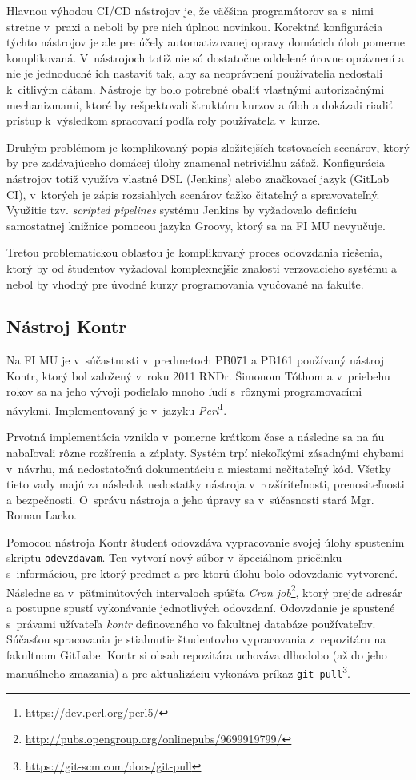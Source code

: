 \documentclass[
  digital, %
  oneside, %
  table,   %
  lof,     %
  lot,   %
]{fithesis3}
\newcommand*{\footurl}[1]{\footnote{\url{#1}}}
\begin{document}
Hlavnou výhodou CI/CD nástrojov je, že väčšina programátorov sa s~nimi stretne v~praxi a neboli by pre nich úplnou novinkou. Korektná konfigurácia týchto nástrojov je ale pre účely automatizovanej opravy domácich úloh pomerne komplikovaná. V~nástrojoch totiž nie sú dostatočne oddelené úrovne oprávnení a nie je jednoduché ich nastaviť tak, aby sa neoprávnení používatelia nedostali k~citlivým dátam. Nástroje by bolo potrebné obaliť vlastnými autorizačnými mechanizmami, ktoré by rešpektovali štruktúru kurzov a úloh a dokázali riadiť prístup k~výsledkom spracovaní podľa roly používateľa v~kurze.

Druhým problémom je komplikovaný popis zložitejších testovacích scenárov, ktorý by pre zadávajúceho domácej úlohy znamenal netriviálnu záťaž. Konfigurácia nástrojov totiž využíva vlastné DSL (Jenkins) alebo značkovací jazyk (GitLab CI), v~ktorých je zápis rozsiahlych scenárov ťažko čitateľný a spravovateľný. Využitie tzv. \textit{scripted pipelines} systému Jenkins by vyžadovalo definíciu samostatnej knižnice pomocou jazyka Groovy, ktorý sa na FI MU nevyučuje.

Treťou problematickou oblasťou je komplikovaný proces odovzdania riešenia, ktorý by od študentov vyžadoval komplexnejšie znalosti verzovacieho systému a nebol by vhodný pre úvodné kurzy programovania vyučované na fakulte.

\subsection{Nástroj Kontr}

Na FI MU je v~súčastnosti v~predmetoch PB071 a PB161 používaný nástroj Kontr, ktorý bol založený v~roku 2011 RNDr. Šimonom Tóthom a v~priebehu rokov sa na jeho vývoji podieľalo mnoho ľudí s~rôznymi programovacími návykmi. Implementovaný je v~jazyku \emph{Perl}\footnote{\url{https://dev.perl.org/perl5/}}.

Prvotná implementácia vznikla v~pomerne krátkom čase a následne sa na ňu nabaľovali rôzne rozšírenia a záplaty. Systém trpí niekoľkými zásadnými chybami v~návrhu, má nedostatočnú dokumentáciu a miestami nečitateľný kód. Všetky tieto vady majú za následok nedostatky nástroja v~rozšíriteľnosti, prenositeľnosti a bezpečnosti. O~správu nástroja a jeho úpravy sa v~súčasnosti stará Mgr. Roman Lacko. 

Pomocou nástroja Kontr študent odovzdáva vypracovanie svojej úlohy spustením skriptu \texttt{odevzdavam}. Ten vytvorí nový súbor v~špeciálnom priečinku s~informáciou, pre ktorý predmet a pre ktorú úlohu bolo odovzdanie vytvorené. Následne sa v~päťminútových intervaloch spúšťa \textit{Cron job}\footnote{\url{http://pubs.opengroup.org/onlinepubs/9699919799/}}, ktorý prejde adresár a postupne spustí vykonávanie jednotlivých odovzdaní. Odovzdanie je spustené s~právami užívateľa \emph{kontr} definovaného vo fakultnej databáze používateľov. Súčasťou spracovania je stiahnutie študentovho vypracovania z~repozitáru na fakultnom GitLabe. Kontr si obsah repozitára uchováva dlhodobo (až do jeho manuálneho zmazania) a pre aktualizáciu vykonáva príkaz \texttt{git pull}\footurl{https://git-scm.com/docs/git-pull}. 
\end{document}
